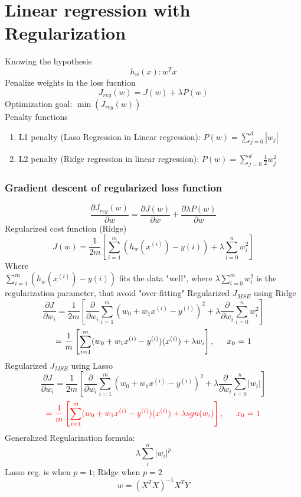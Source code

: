\documentclass{article}
\begin{document}
\section*{Linear regression with Regularization}
Knowing the hypothesis 
\[h_w(x): w^Tx\]
Penalize weights in the loss fucntion
\[J_{reg}(w) = J(w) + \lambda P(w)\]
Optimization goal: $\min(J_{reg}(w))$\\
Penalty functions
\begin{enumerate}
    \item L1 penalty (Laso Regression in Linear regression): $P(w) = \sum_{j=0}^{d}|w_j|$
    \item L2 penalty (Ridge regression in linear regression): $P(w) = \sum_{j=0}^{d}\frac{1}{2}w^2_j$
\end{enumerate}

\subsubsection*{Gradient descent of regularized loss function}
\begin{equation}
    \frac{\partial J_{reg}(w)}{\partial w} = \frac{\partial J(w)}{\partial w} + \frac{\partial \lambda P(w)}{\partial w}
\end{equation}
Regularized cost function (Ridge)
\[J(w) = \frac{1}{2m}\left[\sum_{i = 1}^{m}(h_w(x^{(i)})- y{(i)}) + \lambda\sum_{i=0}^{n} w_i^2\right]\]
Where \\
$\sum_{i = 1}^{m}(h_w(x^{(i)})- y{(i)})$ fits the data "well", where
$ \lambda\sum_{i=0}^{m} w_i^2$ is the regularization parameter, that avoid "over-fitting"
Regularized $J_{MSE}$ using Ridge
\[\frac{\partial J}{\partial w_i}  = \frac{1}{2m} \left[\frac{\partial}{\partial w_i}\sum_{i=1}^{m}(w_0 + w_1 x^{(i)} - y^{(i)})^2 
+ \lambda \frac{\partial}{\partial w_i} \sum_{i = 0}^{n}w_i^2\right]\]
\[= \frac{1}{m} \left[\sum_{i=1}^{m} (w_0 + w_1x^{(i)} - y^{(i)})(x^{(i)}) + \lambda w_i\right], \indent x_0\text{ = 1}\]
Regularized $J_{MSE}$ using Lasso
\[\frac{\partial J}{\partial w_i}  = \frac{1}{2m} \left[\frac{\partial}{\partial w_i}\sum_{i=1}^{m}(w_0 + w_1 x^{(i)} - y^{(i)})^2 
+ \lambda \frac{\partial}{\partial w_i} \sum_{i = 0}^{n}|w_i|\right]\]
\[\color{red}= \frac{1}{m} \left[\sum_{i=1}^{m} (w_0 + w_1x^{(i)} - y^{(i)})(x^{(i)}) + \lambda sgn(w_i)\right], \indent x_0\text{ = 1}\]
Generalized Regularization formula:
\[\lambda \sum_{i}^{n}|w_i|^p\]
Lasso reg. is when $p = 1$; Ridge when $p = 2$
\[w = (X^TX)^{-1}X^TY\]
\end{document}
